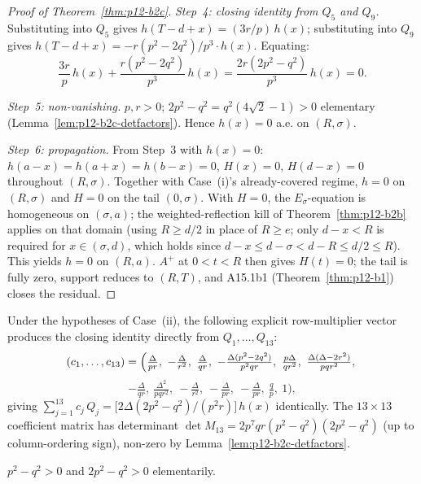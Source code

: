 \begin{proof}[Proof of Theorem~\ref{thm:p12-b2c}]
\smallskip
\noindent\emph{Step~4: closing identity from $Q_{5}$ and $Q_{9}$.}
Substituting into $Q_{5}$ gives
$h(T - d + x) = (3 r / p)\, h(x)$;
substituting into $Q_{9}$ gives
$h(T - d + x) = -r (p^{2} - 2 q^{2}) / p^{3} \cdot h(x)$.
Equating:
\[
\frac{3 r}{p}\, h(x) + \frac{r (p^{2} - 2 q^{2})}{p^{3}}\, h(x)
= \frac{2 r (2 p^{2} - q^{2})}{p^{3}}\, h(x) = 0.
\]

\smallskip
\noindent\emph{Step~5: non-vanishing.}
$p, r > 0$; $2p^{2} - q^{2} = q^{2}(4\sqrt{2} - 1) > 0$
elementary (Lemma~\ref{lem:p12-b2c-detfactors}).
Hence $h(x) = 0$ a.e. on $(R, \sigma)$.

\smallskip
\noindent\emph{Step~6: propagation.}  From Step~3 with $h(x) = 0$:
$h(a - x) = h(a + x) = h(b - x) = 0$, $H(x) = 0$, $H(d - x) = 0$
throughout $(R, \sigma)$.  Together with Case~(i)'s already-covered
regime, $h = 0$ on $(R, \sigma)$ and $H = 0$ on the tail
$(0, \sigma)$.  With $H = 0$, the $E_{\sigma}$-equation is
homogeneous on $(\sigma, a)$; the weighted-reflection kill of
Theorem~\ref{thm:p12-b2b} applies on that domain (using $R \ge d/2$
in place of $R \ge e$; only $d - x < R$ is required for
$x \in (\sigma, d)$, which holds since $d - x \le d - \sigma <
d - R \le d/2 \le R$).  This yields $h = 0$ on $(R, a)$.
$A^{+}$ at $0 < t < R$ then gives $H(t) = 0$; the tail is fully
zero, support reduces to $(R, T)$, and A15.1b1
(Theorem~\ref{thm:p12-b1}) closes the residual.
\end{proof}

\begin{corollary}
\label{cor:p12-b2c-certificate}
Under the hypotheses of Case~(ii), the following explicit
row-multiplier vector produces the closing identity directly from
$Q_{1}, \dots, Q_{13}$:
\[
(c_{1}, \dots, c_{13}) = \Bigl(
\tfrac{\Delta}{p r},\
-\tfrac{\Delta}{r^{2}},\
\tfrac{\Delta}{q r},\
-\tfrac{\Delta(p^{2} - 2q^{2})}{p^{2} q r},\
\tfrac{p \Delta}{q r^{2}},\
\tfrac{\Delta(\Delta - 2r^{2})}{p q r^{2}},\
\]
\[
-\tfrac{\Delta}{q r},\
\tfrac{\Delta^{2}}{p q r^{2}},\
-\tfrac{\Delta}{r^{2}},\
-\tfrac{\Delta}{p r},\
-\tfrac{\Delta}{p r},\
\tfrac{q}{p},\
1
\Bigr),
\]
giving
$\sum_{j = 1}^{13} c_{j}\, Q_{j}
= \bigl[2 \Delta (2p^{2} - q^{2}) / (p^{2} r)\bigr]\, h(x)$
identically.  The $13 \times 13$ coefficient matrix has determinant
$\det M_{13} = 2 p^{7} q r (p^{2} - q^{2})(2p^{2} - q^{2})$
(up to column-ordering sign), non-zero by
Lemma~\ref{lem:p12-b2c-detfactors}.
\end{corollary}

\begin{lemma}[Elementary non-vanishing]
\label{lem:p12-b2c-detfactors}
$p^{2} - q^{2} > 0$ and $2p^{2} - q^{2} > 0$ elementarily.
\end{lemma}


